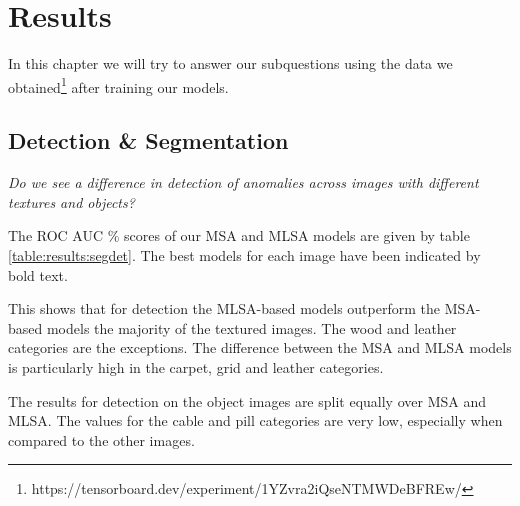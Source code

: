 \chapter{Results}\label{ch:results}

In this chapter we will try to answer our subquestions using the data we obtained\footnote{https://tensorboard.dev/experiment/1YZvra2iQseNTMWDeBFREw/} after training our models.

\section{Detection \& Segmentation}

\textit{Do we see a difference in detection of anomalies across images with different textures and objects?}

The ROC AUC \% scores of our MSA and MLSA models are given by table \ref{table:results:segdet}. The best models for each image have been indicated by bold text.

This shows that for detection the MLSA-based models outperform the MSA-based models the majority of the textured images. The wood and leather categories are the exceptions. The difference between the MSA and MLSA models is particularly high in the carpet, grid and leather categories.

The results for detection on the object images are split equally over MSA and MLSA. The values for the cable and pill categories are very low, especially when compared to the other images. 

